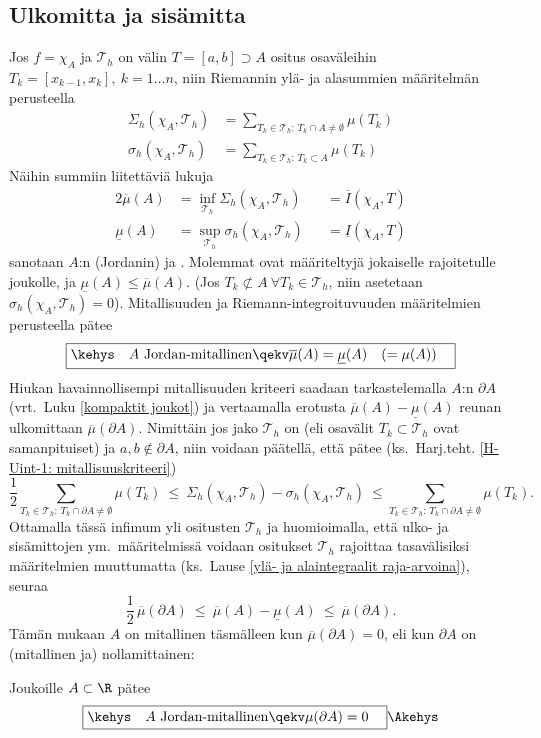 \subsection*{Ulkomitta ja sisämitta}

Jos $f=\chi_A$ ja $\mathcal{T}_h$ on välin $T=[a,b]\supset A$ ositus osaväleihin
$T_k=[x_{k-1},x_k],\ k=1 \ldots n$, niin Riemannin ylä- ja alasummien määritelmän perusteella
\begin{align*}
\Sigma_h(\chi_A,\mathcal{T}_h) &= \sum_{T_k\in\mathcal{T}_h:\,T_k\cap A\neq\emptyset}\mu(T_k) \\
\sigma_h(\chi_A,\mathcal{T}_h) &= \sum_{T_k\in\mathcal{T}_h:\,T_k\subset A}\mu(T_k)
\end{align*}
Näihin summiin liitettäviä lukuja
\begin{alignat*}{2}
\overline{\mu}(A)  &= \inf_{\mathcal{T}_h} \Sigma_h(\chi_A,\mathcal{T}_h) & 
                   &= \overline{I}(\chi_A,T) \\
\underline{\mu}(A) &= \sup_{\mathcal{T}_h} \sigma_h(\chi_A,\mathcal{T}_h) & 
                   &= \underline{I}(\chi_A,T)
\end{alignat*}
sanotaan $A$:n (Jordanin)  ja . Molemmat ovat määriteltyjä
jokaiselle rajoitetulle joukolle, ja $\underline{\mu}(A)\leq\overline{\mu}(A)$. 
(Jos $T_k\not\subset A \ \forall T_k\in\mathcal{T}_h$, niin asetetaan
$\sigma_h(\chi_A,\mathcal{T}_h)=0$). Mitallisuuden ja Riemann-integroituvuuden määritelmien
perusteella pätee
\[
\boxed{\kehys\quad A\ \text{Jordan-mitallinen} 
            \qekv \overline{\mu}(A)=\underline{\mu}(A) \quad (=\mu(A)) \quad}
\]
Hiukan havainnollisempi mitallisuuden kriteeri saadaan tarkastelemalla $A$:n 
$\partial A$ (vrt.\ Luku \ref{kompaktit joukot}) ja vertaamalla erotusta 
$\overline{\mu}(A)-\underline{\mu}(A)$ reunan ulkomittaan $\overline{\mu}(\partial A)$. 
Nimittäin jos jako $\mathcal{T}_h$ on  
(eli osavälit $T_k\subset\mathcal{T}_h$ ovat samanpituiset) ja $a,b\not\in\partial A$, niin voidaan
päätellä, että pätee (ks.\ Harj.teht. \ref{H-Uint-1: mitallisuuskriteeri})
\[
\frac{1}{2}\sum_{T_k\in\mathcal{T}_h:\,T_k\cap \partial A\neq\emptyset} \mu(T_k)\
  \le\ \Sigma_h(\chi_{A},\mathcal{T}_h) - \sigma_h(\chi_{A},\mathcal{T}_h)\
  \le \sum_{T_k\in\mathcal{T}_h:\,T_k\cap \partial A\neq\emptyset} \mu(T_k).
\]
Ottamalla tässä infimum yli ositusten $\mathcal{T}_h$ ja huomioimalla, että ulko- ja
sisämittojen ym.\ määritelmissä voidaan ositukset $\mathcal{T}_h$ rajoittaa tasavälisiksi
määritelmien muuttumatta (ks.\ Lause \ref{ylä- ja alaintegraalit raja-arvoina}), seuraa 
\[
\frac{1}{2}\,\overline{\mu}(\partial A)\ \le\ \overline{\mu}(A)-\underline{\mu}(A)\
                                         \le\ \overline{\mu}(\partial A). 
\]
Tämän mukaan $A$ on mitallinen täsmälleen kun $\overline{\mu}(\partial A)=0$, eli kun 
$\partial A$ on (mitallinen ja) nollamittainen:
\begin{Lause}  \label{mitallisuuskriteeri-R} Joukoille
$A\subset\R$ pätee
\[ 
\boxed{\kehys\quad A\ \text{Jordan-mitallinen} \qekv \mu(\partial A)=0 \quad} \Akehys
\]
\end{Lause}

